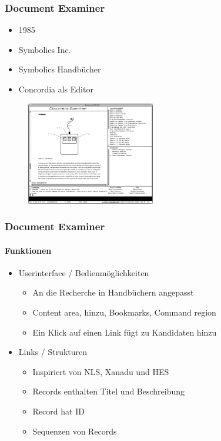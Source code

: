 \begin{frame}
\frametitle{Document Examiner}
\begin{itemize}
	\item 1985
	\item Symbolics Inc.
	\item Symbolics Handbücher
	\item Concordia als Editor
\end{itemize}

\begin{figure}[htbp]
	\centering
	\includegraphics[width=0.5\textwidth]{images/documentExaminer}
\end{figure}

\end{frame}

\begin{frame}
\frametitle{Document Examiner}
\framesubtitle{Funktionen}
	\begin{itemize}
		\item Userinterface / Bedienmöglichkeiten
		\begin{itemize}
			\item An die Recherche in Handbüchern angepasst
			\item Content area, hinzu, Bookmarks, Command region
			\item Ein Klick auf einen Link fügt zu Kandidaten hinzu
		\end{itemize}
		\item Links / Strukturen
		\begin{itemize}
			\item Inspiriert von NLS, Xanadu und HES
			\item Records enthalten Titel und Beschreibung
			\item Record hat ID
			\item Sequenzen von Records
		\end{itemize}
	\end{itemize}
\end{frame}
